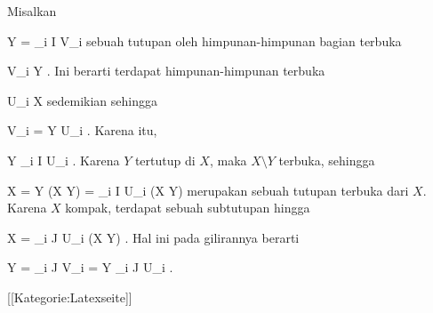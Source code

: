 Misalkan

\mavergleichskettedisp
{\vergleichskette
{ Y
}
{ =} { \bigcup_{i \in I} V_i
}
{ } {
}
{ } {
}
{ } {
}
}
{}{}{}
sebuah tutupan oleh himpunan-himpunan bagian terbuka

\mavergleichskette
{\vergleichskette
{ V_i
}
{ \subseteq }{ Y
}
{  }{
}
{    }{
}
{   }{
}
}
{}{}{.}
Ini berarti terdapat himpunan-himpunan terbuka

\mavergleichskette
{\vergleichskette
{ U_i
}
{ \subseteq }{ X
}
{  }{
}
{    }{
}
{   }{
}
}
{}{}{}
sedemikian sehingga

\mavergleichskette
{\vergleichskette
{ V_i
}
{ = }{ Y \cap U_i
}
{  }{
}
{    }{
}
{   }{
}
}
{}{}{.}
Karena itu,

\mavergleichskettedisp
{\vergleichskette
{ Y
}
{ \subseteq} { \bigcup_{i \in I} U_i
}
{ } {
}
{ } {
}
{ } {
}
}
{}{}{.}
Karena $Y$ tertutup di $X$, maka $X \setminus Y$ terbuka, sehingga

\mavergleichskettedisp
{\vergleichskette
{ X
}
{ =} { Y \cup (X \setminus Y)
}
{ =} { \bigcup_{i \in I} U_i  \cup  (X \setminus Y)
}
{ } {
}
{ } {
}
}
{}{}{}
merupakan sebuah tutupan terbuka dari $X$. Karena $X$ kompak, terdapat sebuah subtutupan hingga

\mavergleichskettedisp
{\vergleichskette
{ X
}
{ =} { \bigcup_{i \in J} U_i  \cup  (X \setminus Y)
}
{ } {
}
{ } {
}
{ } {}
}
{}{}{.}
Hal ini pada gilirannya berarti

\mavergleichskettedisp
{\vergleichskette
{ Y
}
{ =} { \bigcup_{i \in J} V_i
}
{ =} { Y \cap \bigcup_{i \in J} U_i
}
{ } {
}
{ } {}
}
{}{}{.}

 [[Kategorie:Latexseite]]
